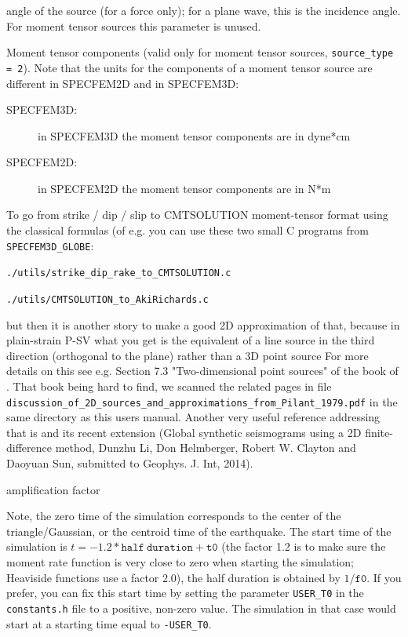\documentclass[oneside,english,onecolumn,letterpaper]{book}
\begin{document}
\begin{description}[font=\ttfamily]
\item[anglesource] angle of the source (for a force only); for a plane wave, this is the incidence angle. For moment tensor sources this parameter is unused.

\item[Mxx,Mzz,Mxz] Moment tensor components (valid only for moment tensor sources, \texttt{source\_type = 2}).
Note that the units for the components of a moment tensor source are different in SPECFEM2D and in SPECFEM3D:
%
\begin{description}
\item[SPECFEM3D:] in SPECFEM3D the moment tensor components are in dyne*cm
\item[SPECFEM2D:] in SPECFEM2D the moment tensor components are in N*m
\end{description}

To go from strike / dip / slip to CMTSOLUTION moment-tensor format using the classical formulas (of e.g. \cite{AkRi80} you can use these two small C programs from \texttt{SPECFEM3D\_GLOBE}:

\texttt{./utils/strike\_dip\_rake\_to\_CMTSOLUTION.c}

\texttt{./utils/CMTSOLUTION\_to\_AkiRichards.c}

but then it is another story to make a good 2D approximation of that, because in plain-strain P-SV what you get is the equivalent of a line source in the third direction (orthogonal to the plane) rather than a 3D point source
For more details on this see e.g. Section 7.3 "Two-dimensional point sources" of the book of \cite{Pil79}. That book being hard to find, we scanned the related pages in file\\
\texttt{discussion\_of\_2D\_sources\_and\_approximations\_from\_Pilant\_1979.pdf} in the same directory as this users manual.
Another very useful reference addressing that is \cite{HeVi88} and its recent extension
(Global synthetic seismograms using a 2D finite-difference method,
Dunzhu Li, Don Helmberger, Robert W. Clayton and Daoyuan Sun, submitted to Geophys. J. Int, 2014).

\item[factor] amplification factor

\end{description}

Note, the zero time of the simulation corresponds to the center of the triangle/Gaussian,
or the centroid time of the earthquake. The start time of the simulation
is $t=-1.2*\mathtt{half~duration} + \mathtt{t0}$ (the factor 1.2 is to make sure the moment
rate function is very close to zero when starting the simulation; Heaviside functions use a factor 2.0),
the half duration is obtained by $1/\mathtt{f0}$.
If you prefer, you can fix this start time by setting the parameter \texttt{USER\_T0} in the \texttt{constants.h} file
to a positive, non-zero value. The simulation in that case would start at a starting time equal to \texttt{-USER\_T0}.
\end{document}
